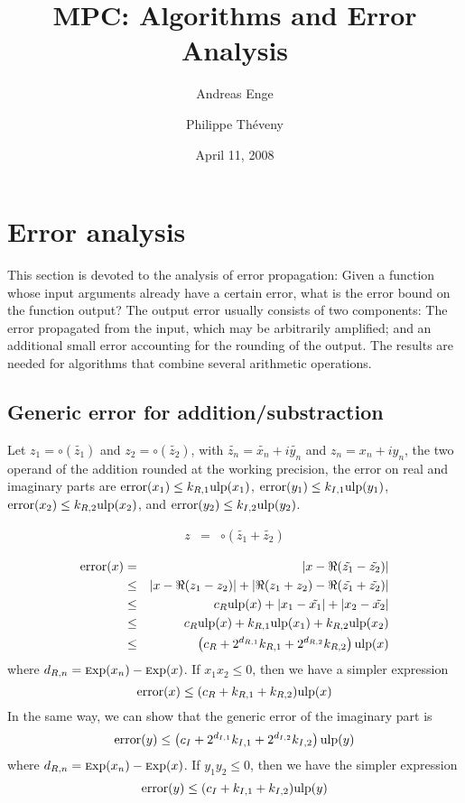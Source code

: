\documentclass {article}
\title {MPC: Algorithms and Error Analysis}
\author {Andreas Enge \and Philippe Th\'eveny}
\date {April 11, 2008}
\DeclareMathOperator{\error}{error}
\newcommand {\Ulp}{{\rm ulp}}
\newcommand {\Exp}{{\rm \textsc exp}}
\begin{document}
\maketitle
\tableofcontents


\section {Error analysis}

This section is devoted to the analysis of error propagation: Given a function whose input arguments already have a certain error, what is the error bound on the function output? The output error usually consists of two components: The error propagated from the input, which may be arbitrarily amplified; and an additional small error accounting for the rounding of the output. The results are needed for algorithms that combine several arithmetic operations.

\subsection {Generic error for addition/substraction}

Let $z_1 = \circ(\tilde{z_1})$ and $z_2 = \circ(\tilde{z_2})$, with
$\tilde{z_n} = \tilde{x_n} + i \tilde{y_n}$ and $z_n = x_n + i y_n$,
the two operand of the addition rounded at the working precision, the error on
real and imaginary parts are $\error(x_1) \leq k_{R,1} \Ulp(x_1)$,
$\error(y_1) \leq k_{I,1} \Ulp(y_1)$, $\error(x_2) \leq k_{R,2}
\Ulp(x_2)$, and $\error(y_2) \leq k_{I,2} \Ulp(y_2)$.

\begin{eqnarray}
z&=&\circ(\tilde{z_1}+\tilde{z_2})\\\nonumber
\end{eqnarray}
\begin{eqnarray}\nonumber
\error(x)&=&|x-\Re(\tilde{z_1}-\tilde{z_2})|\\\nonumber
&\leq&|x-\Re(z_1-z_2)|+|\Re(z_1+z_2)-\Re(\tilde{z_1}+\tilde{z_2})|\\\nonumber
&\leq&c_R \Ulp(x) + |x_1 - \tilde{x_1}| + |x_2 - \tilde{x_2}|\\\nonumber
&\leq&c_R \Ulp(x) + k_{R,1} \Ulp(x_1) + k_{R,2} \Ulp(x_2)\\\nonumber
&\leq&\left(c_R + 2^{d_{R,1}} k_{R,1} + 2^{d_{R,2}} k_{R,2} \right) \Ulp(x)
\nonumber
\end{eqnarray}
where $d_{R,n}=\Exp(x_n)-\Exp(x)$. If $x_1x_2 \leq 0$, then we have a simpler expression
\[
\error(x) \leq (c_R+k_{R,1}+k_{R,2}) \Ulp(x)
\]
In the same way, we can show that the generic error of the imaginary part is
\[
\error (y) \leq \left(c_I + 2^{d_{I,1}} k_{I,1} + 2^{d_{I,2}} k_{I,2} \right) \Ulp(y)
\]
where $d_{R,n}=\Exp(x_n)-\Exp(x)$. If $y_1y_2 \leq 0$, then we have the simpler expression
\[
\error(y) \leq (c_I+k_{I,1}+k_{I,2}) \Ulp(y)
\]
\end{document}
